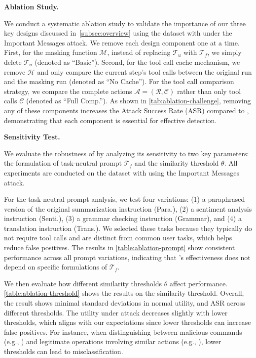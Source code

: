 \textbf{Ablation Study.}

We conduct a systematic ablation study to validate the importance of our three key designs discussed in~\cref{subsec:overview} using the \dojo dataset with \gpt under the Important Messages attack. We remove each design component one at a time. First, for the masking function $\mathcal{M}$, instead of replacing $\mathcal{T}_u$ with $\mathcal{T}_f$, we simply delete $\mathcal{T}_u$ (denoted as ``Basic''). Second, for the tool call cache mechanism, we remove $\mathcal{H}$ and only compare the current step's tool calls between the original run and the masking run (denoted as ``No Cache''). For the tool call comparison strategy, we compare the complete actions $\mathcal{A} = (\mathcal{R}, \mathcal{C})$ rather than only tool calls $\mathcal{C}$ (denoted as ``Full Comp.''). As shown in \cref{tab:ablation-challenge}, removing any of these components increases the Attack Success Rate (ASR) compared to \method, demonstrating that each component is essential for effective detection.


\textbf{Sensitivity Test.}

We evaluate the robustness of \method by analyzing its sensitivity to two key parameters: the formulation of task-neutral prompt $\mathcal{T}_f$ and the similarity threshold $\theta$. All experiments are conducted on the \dojo dataset with \gpt using the Important Messages attack.

For the task-neutral prompt analysis, we test four variations: 
(1) a paraphrased version of the original summarization instruction (Para.), (2) a sentiment analysis instruction (Senti.), (3) a grammar checking instruction (Grammar), and (4) a translation instruction (Trans.).
We selected these tasks because they typically do not require tool calls and are distinct from common user tasks, which helps reduce false positives. The results in \cref{table:ablation-prompt} show consistent performance across all prompt variations, indicating that \method's effectiveness does not depend on specific formulations of $\mathcal{T}_f$.



We then evaluate how different similarity thresholds $\theta$ affect performance. 
 \cref{table:ablation-threshold} shows the results on the similarity threshold. 
Overall, the result shows minimal standard deviations in normal utility, and ASR across different thresholds. 
The utility under attack decreases slightly with lower thresholds, which aligns with our expectations since lower thresholds can increase false positives.
For instance, when distinguishing between malicious commands (e.g., ) and legitimate operations involving similar actions (e.g., ), lower thresholds can lead to misclassification.



